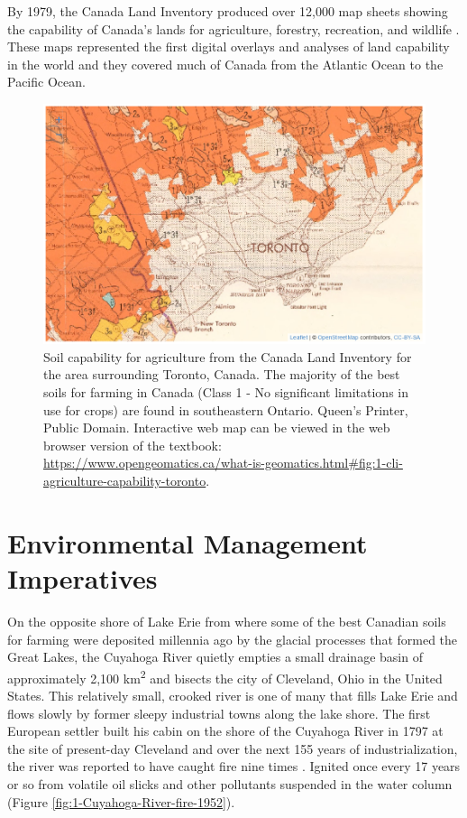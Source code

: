 \documentclass[
]{book}
\begin{document}
By 1979, the Canada Land Inventory produced over 12,000 map sheets showing the capability of Canada's lands for agriculture, forestry, recreation, and wildlife \citep{fisher_overview_1979}. These maps represented the first digital overlays and analyses of land capability in the world and they covered much of Canada from the Atlantic Ocean to the Pacific Ocean.



\begin{figure}
\includegraphics[width=1\linewidth]{images/01-cli-agriculture-capability-toronto} \caption{Soil capability for agriculture from the Canada Land Inventory for the area surrounding Toronto, Canada. The majority of the best soils for farming in Canada (Class 1 - No significant limitations in use for crops) are found in southeastern Ontario. Queen's Printer, Public Domain. Interactive web map can be viewed in the web browser version of the textbook: \url{https://www.opengeomatics.ca/what-is-geomatics.html\#fig:1-cli-agriculture-capability-toronto}.}\label{fig:1-cli-agriculture-capability-toronto}
\end{figure}

\section{Environmental Management Imperatives}\label{environmental-management-imperatives}

On the opposite shore of Lake Erie from where some of the best Canadian soils for farming were deposited millennia ago by the glacial processes that formed the Great Lakes, the Cuyahoga River quietly empties a small drainage basin of approximately 2,100 km\textsuperscript{2} and bisects the city of Cleveland, Ohio in the United States. This relatively small, crooked river is one of many that fills Lake Erie and flows slowly by former sleepy industrial towns along the lake shore. The first European settler built his cabin on the shore of the Cuyahoga River in 1797 at the site of present-day Cleveland and over the next 155 years of industrialization, the river was reported to have caught fire nine times \citep{la_bella_not_2009}. Ignited once every 17 years or so from volatile oil slicks and other pollutants suspended in the water column (Figure \ref{fig:1-Cuyahoga-River-fire-1952}).
\end{document}
